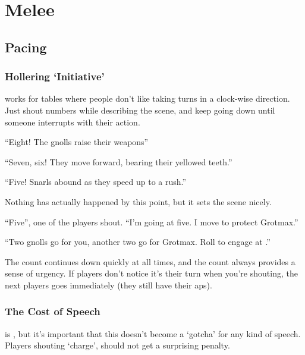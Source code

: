 \pagebreak[4]
\section{Melee}

\begin{multicols}{2}

\subsection{Pacing}

\subsubsection{Hollering `Initiative'}
works for tables where people don't like taking turns in a clock-wise direction.
Just shout numbers while describing the scene, and keep going down until someone interrupts with their action.

\begin{speechtext}

``Eight! The gnolls raise their weapons''

``Seven, six! They move forward, bearing their yellowed teeth.''

``Five! Snarls abound as they speed up to a rush.''

\end{speechtext}

Nothing has actually happened by this point, but it sets the scene nicely.

\begin{speechtext}

  ``Five'', one of the players shout.
  ``I'm going at five.
  I move to protect Grotmax.''

  ``Two gnolls go for you, another two go for Grotmax.
  Roll to engage at \tn[11].''

\end{speechtext}

The count continues down quickly at all times, and the count always provides a sense of urgency.
If players don't notice it's their turn when you're shouting, the next players goes immediately (they still have their \glspl{ap}).

\subsubsection{The Cost of Speech}
is , but it's important that this doesn't become a `gotcha' for any kind of speech.
Players shouting `charge', should not get a surprising penalty.


\end{multicols}
